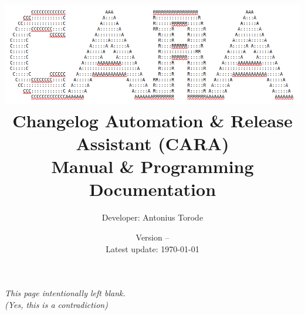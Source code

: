 \documentclass[openany,a4paper,10pt]{book}
\title{\vspace{0.1cm}  \includegraphics[scale=0.6]{./images/cara_cover.png} \vspace{.5cm} \\ Changelog Automation \& Release Assistant (CARA) \\  Manual \& Programming Documentation}
\author{Developer: Antonius Torode}
\date{Version -- \version \\ Latest update: \today}
\begin{document}
\frontmatter
\maketitle

\tableofcontents
\newpage
\vspace*{\fill}
\begin{center}
	\textit{This page intentionally left blank. \\(Yes, this is a contradiction)}
\end{center}
\vspace*{\fill}

\mainmatter
\pagestyle{fancy}
\fancyhf{}
\fancyhead[RO, LE]{\thepage}







\backmatter
%

\printindex
\end{document}
